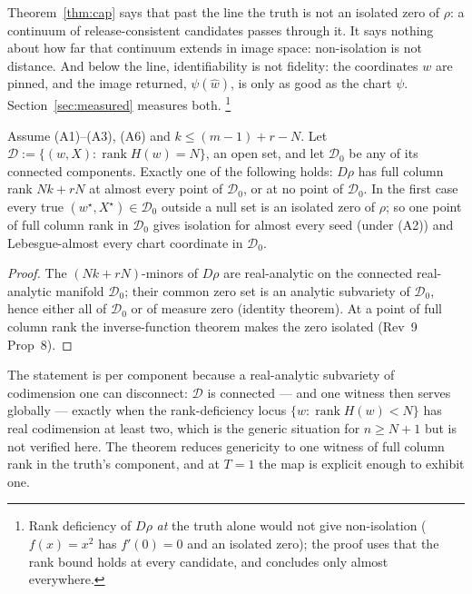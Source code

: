\begin{remark}\label{rem:distance}
Theorem~\ref{thm:cap} says that past the line the truth is not an isolated
zero of $\rho$: a continuum of release-consistent candidates passes through
it. It says nothing about how far that continuum extends in image space:
non-isolation is not distance. And below the line, identifiability is not
fidelity: the coordinates $w$ are pinned, and the image returned, $\psi(\hat
w)$, is only as good as the chart $\psi$. Section~\ref{sec:measured} measures
both.
\footnote{Rank deficiency of $D\rho$ \emph{at} the truth alone would not give
non-isolation ($f(x)=x^2$ has $f'(0)=0$ and an isolated zero); the proof uses
that the rank bound holds at every candidate, and concludes only almost
everywhere.}
\end{remark}

\begin{theorem}\label{thm:suff}
Assume (A1)--(A3), (A6) and $k\le(m-1)+r-N$. Let
$\mathcal D:=\{(w,X):\operatorname{rank}H(w)=N\}$, an open set, and let
$\mathcal D_0$ be any of its connected components. Exactly one of the
following holds: $D\rho$ has full column rank $Nk+rN$ at almost every point
of $\mathcal D_0$, or at no point of $\mathcal D_0$. In the first case every
true $(w^\star,X^\star)\in\mathcal D_0$ outside a null set is an isolated
zero of $\rho$; so one point of full column rank in $\mathcal D_0$ gives
isolation for almost every seed (under (A2)) and Lebesgue-almost every chart
coordinate in $\mathcal D_0$.
\end{theorem}
\begin{proof}
The $(Nk+rN)$-minors of $D\rho$ are real-analytic on the connected
real-analytic manifold $\mathcal D_0$; their common zero set is an analytic
subvariety of $\mathcal D_0$, hence either all of $\mathcal D_0$ or of
measure zero (identity theorem). At a point of full column rank the
inverse-function theorem makes the zero isolated (Rev~9 Prop~8).
\end{proof}

The statement is per component because a real-analytic subvariety of
codimension one can disconnect: $\mathcal D$ is connected — and one witness
then serves globally — exactly when the rank-deficiency locus
$\{w:\operatorname{rank}H(w)<N\}$ has real codimension at least two, which is
the generic situation for $n\ge N+1$ but is not verified here. The theorem
reduces genericity to one witness of full column rank in the truth's
component, and at $T=1$ the map is explicit enough to exhibit one.

